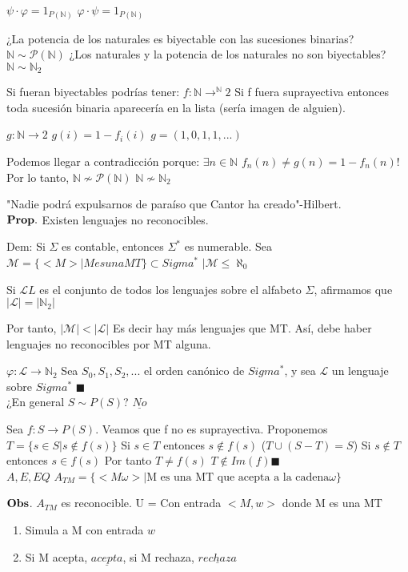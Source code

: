 \documentclass{homework}
\begin{document}
$\psi \cdot \varphi = 1_{P(\mathds{N})}$
$\varphi \cdot \psi = 1_{P(\mathds{N})}$

¿La potencia de los naturales es biyectable con las sucesiones binarias? $\mathds{N} \sim \mathcal{P}(\mathds{N})$
¿Los naturales y la potencia de los naturales no son biyectables?
$\mathds{N} \sim \mathds{N}_2$

Si fueran biyectables podrías tener:
$f: \mathds{N} \rightarrow^{\mathds{N}} 2$
Si f fuera suprayectiva entonces toda sucesión binaria aparecería en la lista (sería imagen de alguien).

$g: \mathds{N} \rightarrow 2$
$g(i) = 1 - f_{i}(i)$
$g = (1,0,1,1,...)$

Podemos llegar a contradicción porque:
$\exists n \in \mathds{N}$
$f_{n}(n) \not= g(n) = 1 - f_{n}(n) $!
Por lo tanto,
$\mathds{N} \nsim \mathcal{P}(\mathds{N})$
$\mathds{N} \nsim \mathds{N}_2$

"Nadie podrá expulsarnos de paraíso que Cantor ha creado"-Hilbert.\\

$\bf{Prop.}$ Existen lenguajes no reconocibles.

Dem: 
Si $\Sigma$ es contable, entonces $\Sigma^{*}$ es numerable.
Sea $\mathcal{M} = \{<M> | M es una MT\} \subset Sigma^{*}$
$|\mathcal{M} \leq \aleph_{0}$

Si $\mathcal{L}L$ es el conjunto de todos los lenguajes sobre el alfabeto $\Sigma$, afirmamos que $|\mathcal{L}| = |\mathds{N}_2|$

Por tanto, $|\mathcal{M}|< |\mathcal{L}|$
Es decir hay más lenguajes que MT. Así, debe haber lenguajes no reconocibles por MT alguna.

$\varphi : \mathcal{L} \rightarrow \mathds{N}_2$
Sea $S_0, S_1, S_2, ...$ el orden canónico de $Sigma^{*}$, y sea $\mathcal{L}$ un lenguaje sobre $Sigma^{*}$ $\blacksquare$\\

¿En general $S \sim P(S)$? $\underline{No}$

Sea $f: S \rightarrow P(S)$. Veamos que f no es suprayectiva. Proponemos $T = \{s \in S | s \notin f(s)\}$
Si $s \in T$ entonces $s \notin f(s)$ ($T \cup (S-T) = S$)
Si $s \notin T$ entonces $s \in f(s)$
Por tanto $T \neq f(s)$
$T \notin Im(f)\blacksquare$\\


$A,E,EQ$
$A_{TM} = \{<M \omega> | \text{M es una MT que acepta a la cadena} \omega\}$

$\bf{Obs}$. $A_{TM}$ es reconocible.
	U = Con entrada $<M, w>$ donde M es una MT
\begin{enumerate}
	\item Simula a M con entrada $w$
	\item Si M acepta, $\underline{acepta}$, si M rechaza, $\underline{rechaza}$
\end{enumerate}
\end{document}

